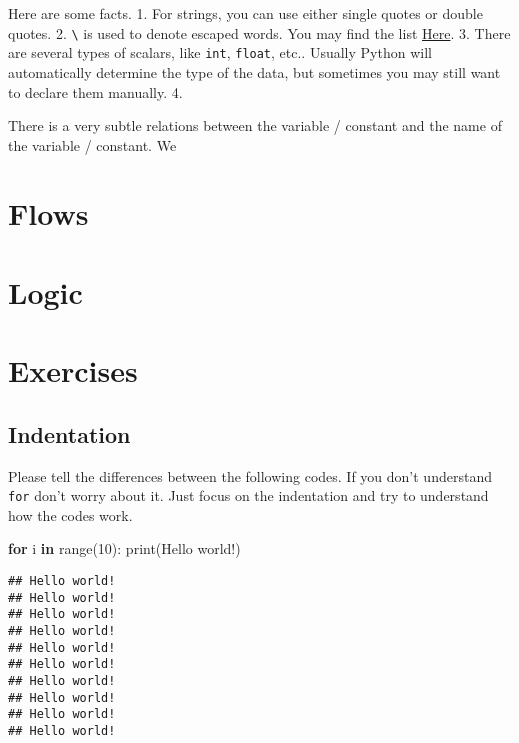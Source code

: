\documentclass[
]{book}
\newenvironment{Shaded}{\begin{snugshade}}{\end{snugshade}}
\newcommand{\BuiltInTok}[1]{#1}
\newcommand{\ControlFlowTok}[1]{\textcolor[rgb]{0.13,0.29,0.53}{\textbf{#1}}}
\newcommand{\DecValTok}[1]{\textcolor[rgb]{0.00,0.00,0.81}{#1}}
\newcommand{\KeywordTok}[1]{\textcolor[rgb]{0.13,0.29,0.53}{\textbf{#1}}}
\newcommand{\NormalTok}[1]{#1}
\newcommand{\StringTok}[1]{\textcolor[rgb]{0.31,0.60,0.02}{#1}}
\begin{document}
Here are some facts.
1. For strings, you can use either single quotes or double quotes.
2. \texttt{\textbackslash{}} is used to denote escaped words. You may find the list \href{https://www.w3schools.com/python/gloss_python_escape_characters.asp}{Here}.
3. There are several types of scalars, like \texttt{int}, \texttt{float}, etc.. Usually Python will automatically determine the type of the data, but sometimes you may still want to declare them manually.
4.

There is a very subtle relations between the variable / constant and the name of the variable / constant. We

\hypertarget{flows}{%
\section{Flows}\label{flows}}

\hypertarget{logic}{%
\section{Logic}\label{logic}}

\hypertarget{exercises}{%
\section{Exercises}\label{exercises}}

\hypertarget{indentation-1}{%
\subsection{Indentation}\label{indentation-1}}

Please tell the differences between the following codes. If you don't understand \texttt{for} don't worry about it. Just focus on the indentation and try to understand how the codes work.

\begin{Shaded}
\begin{Highlighting}[]
\ControlFlowTok{for}\NormalTok{ i }\KeywordTok{in} \BuiltInTok{range}\NormalTok{(}\DecValTok{10}\NormalTok{):}
    \BuiltInTok{print}\NormalTok{(}\StringTok{\textquotesingle{}Hello world!\textquotesingle{}}\NormalTok{)}
\end{Highlighting}
\end{Shaded}

\begin{verbatim}
## Hello world!
## Hello world!
## Hello world!
## Hello world!
## Hello world!
## Hello world!
## Hello world!
## Hello world!
## Hello world!
## Hello world!
\end{verbatim}
\end{document}
